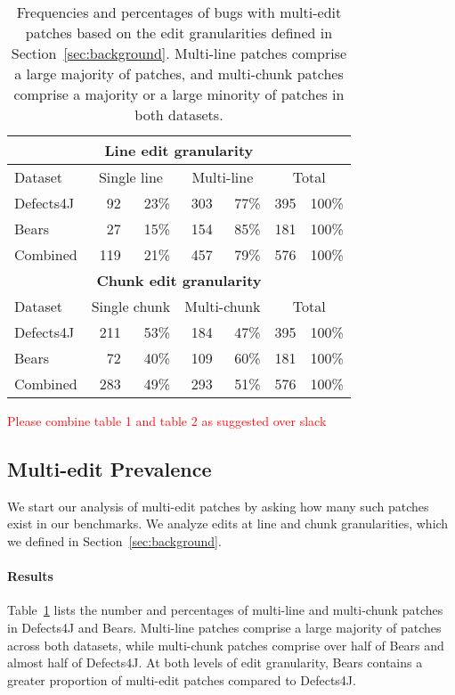 \documentclass[sigconf, timestamp-false, anonymous=true]{acmart}
\newcommand\todo[1]{\textcolor{red}{#1}}
\begin{document}
\begin{table}
{\begin{center}
	\begin{tabular}{l | rr | rr | rr}
		\toprule
		\multicolumn{7}{c}{\textbf{Line edit granularity}} \\
		\midrule
		Dataset & \multicolumn{2}{c}{Single line} & \multicolumn{2}{c}{Multi-line} & \multicolumn{2}{c}{Total} \\
		\midrule
		Defects4J & 92 & 23\% & 303 & 77\% & 395 & 100\%\\
		Bears & 27 & 15\% & 154 & 85\% & 181 & 100\%\\ 
		Combined & 119 & 21\% & 457 & 79\% & 576 & 100\% \\ 
		\midrule
		\multicolumn{7}{c}{\textbf{Chunk edit granularity}} \\
		\midrule
		Dataset & \multicolumn{2}{c}{Single chunk} & \multicolumn{2}{c}{Multi-chunk} & \multicolumn{2}{c}{Total} \\
		\midrule
		Defects4J & 211 & 53\% & 184 & 47\% & 395 & 100\%\\
		Bears & 72 & 40\% & 109 & 60\% & 181 & 100\%\\
		Combined & 283 & 49\% & 293 & 51\% & 576 & 100\%\\
		\bottomrule
	\end{tabular}
 \end{center}
}
	\caption{Frequencies and percentages of bugs with multi-edit patches
	based on the edit granularities defined in Section~\ref{sec:background}.
	Multi-line patches comprise a large majority of patches, and multi-chunk 
	patches comprise a majority or a large minority of patches in both datasets.}
	\label{tab:multiedit-frequencies}
\end{table}


\todo{Please combine table 1 and table 2 as suggested over slack}

\subsection{Multi-edit Prevalence}

We start our analysis of multi-edit patches by asking how many such patches 
exist in our benchmarks. We analyze edits at line and chunk granularities,
which we defined in Section~\ref{sec:background}.

\paragraph{Results} 
Table~\ref{tab:multiedit-frequencies} lists the number and percentages of
multi-line and multi-chunk patches in Defects4J and Bears. 
Multi-line patches comprise a large majority of patches across both datasets, 
while multi-chunk patches comprise over half of Bears and almost half of Defects4J.
At both levels of edit granularity, Bears contains a greater proportion of 
multi-edit patches compared to Defects4J.
\end{document}
